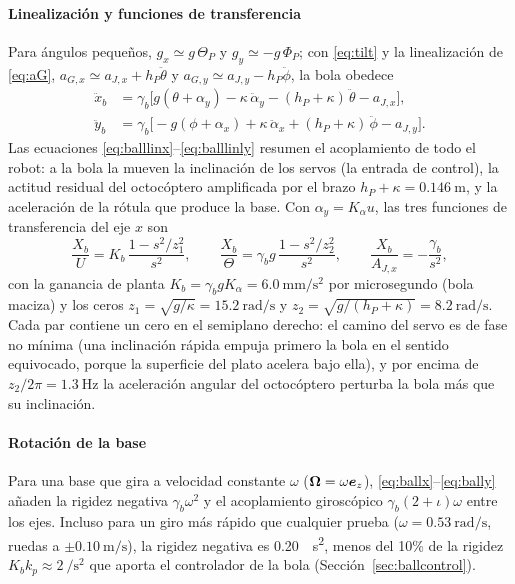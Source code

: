\paragraph{Linealización y funciones de transferencia}
Para ángulos pequeños, $g_x\simeq g\,\Theta_P$ y $g_y\simeq-g\,\Phi_P$; con \eqref{eq:tilt} y la linealización de \eqref{eq:aG}, $a_{G,x}\simeq a_{J,x}+h_P\ddot\theta$ y $a_{G,y}\simeq a_{J,y}-h_P\ddot\phi$, la bola obedece
\begin{align}
  \ddot x_b&=\gamma_b\Big[g(\theta+\alpha_y)-\kappa\,\ddot\alpha_y-(h_P+\kappa)\,\ddot\theta-a_{J,x}\Big], \label{eq:balllinx}\\
  \ddot y_b&=\gamma_b\Big[-g(\phi+\alpha_x)+\kappa\,\ddot\alpha_x+(h_P+\kappa)\,\ddot\phi-a_{J,y}\Big]. \label{eq:balllinly}
\end{align}
Las ecuaciones \eqref{eq:balllinx}--\eqref{eq:balllinly} resumen el acoplamiento de todo el robot: a la bola la mueven la inclinación de los servos (la entrada de control), la actitud residual del octocóptero amplificada por el brazo $h_P+\kappa=\SI{0.146}{\metre}$, y la aceleración de la rótula que produce la base. Con $\alpha_y=K_\alpha u$, las tres funciones de transferencia del eje $x$ son
\begin{equation}
  \frac{X_b}{U}=K_b\,\frac{1-s^2/z_1^2}{s^2},\qquad
  \frac{X_b}{\Theta}=\gamma_b g\,\frac{1-s^2/z_2^2}{s^2},\qquad
  \frac{X_b}{A_{J,x}}=-\frac{\gamma_b}{s^2},
  \label{eq:balltf}
\end{equation}
con la ganancia de planta $K_b=\gamma_bgK_\alpha=\SI{6.0}{\milli\metre\per\second\squared}$ por microsegundo (bola maciza) y los ceros $z_1=\sqrt{g/\kappa}=\SI{15.2}{\radian\per\second}$ y $z_2=\sqrt{g/(h_P+\kappa)}=\SI{8.2}{\radian\per\second}$. Cada par contiene un cero en el semiplano derecho: el camino del servo es de fase no mínima (una inclinación rápida empuja primero la bola en el sentido equivocado, porque la superficie del plato acelera bajo ella), y por encima de $z_2/2\pi=\SI{1.3}{\hertz}$ la aceleración angular del octocóptero perturba la bola más que su inclinación.

\paragraph{Rotación de la base}
Para una base que gira a velocidad constante $\omega$ ($\bm{\Omega}=\omega\bm{e}_z$), \eqref{eq:ballx}--\eqref{eq:bally} añaden la rigidez negativa $\gamma_b\omega^2$ y el acoplamiento giroscópico $\gamma_b(2+\iota)\omega$ entre los ejes. Incluso para un giro más rápido que cualquier prueba ($\omega=\SI{0.53}{\radian\per\second}$, ruedas a $\pm\SI{0.10}{\metre\per\second}$), la rigidez negativa es \SI{0.20}{\per\second\squared}, menos del 10\% de la rigidez $K_bk_p\approx\SI{2}{\per\second\squared}$ que aporta el controlador de la bola (Sección~\ref{sec:ballcontrol}).
